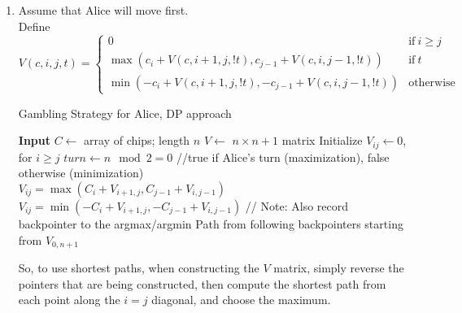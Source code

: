 \documentclass[12pt]{article}
\begin{document}
\begin{enumerate}
\begin{enumerate}
      \item
        Assume that Alice will move first.\\
        Define $V(c,i,j,t)=\begin{cases}
          0 &\mbox{if}\ i\geq j\\
          \max(c_i + V(c,i+1,j,!t), c_{j-1}+V(c,i,j-1,!t)) &\mbox{if}\ t\\
          \min(-c_i + V(c,i+1,j,!t), -c_{j-1}+V(c,i,j-1,!t)) &\mbox{otherwise}\end{cases}$
        \begin{algorithm}
          \caption{Gambling Strategy for Alice, DP approach}
          \begin{algorithmic}[1]
            \State \textbf{Input} $C\gets$ array of chips; length $n$
            \State $V\gets$ $n\times n+1$ matrix
            \State Initialize $V_{ij}\gets0$, for $i\geq j$
            \State $turn\gets n\mod2=0$ //{true if Alice's turn (maximization), false otherwise (minimization)}\\
                    \State $V_{ij}=\max(C_i + V_{i+1,j},C_{j-1} + V_{i,j-1})$
                  \Else
                    \State $V_{ij}=\min(-C_i + V_{i+1,j},-C_{j-1} + V_{i,j-1})$
                  \EndIf
                  \State // Note: Also record backpointer to the argmax/argmin
                \EndFor
              \EndFor
            \EndFor
            \State
            \Return Path from following backpointers starting from $V_{0,n+1}$
          \end{algorithmic}
        \end{algorithm}

        So, to use shortest paths, when constructing the $V$ matrix, simply reverse
        the pointers that are being constructed, then compute the shortest path from
        each point along the $i=j$ diagonal, and choose the maximum.


\end{enumerate}
\end{enumerate}
\end{document}
